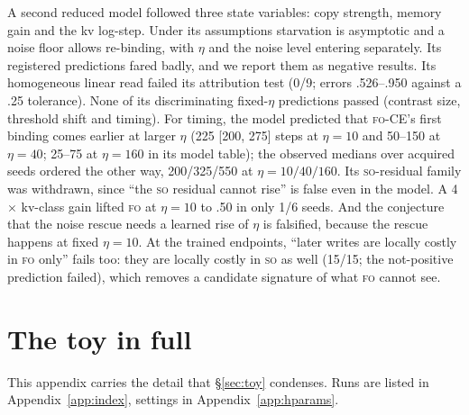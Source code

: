 \documentclass[11pt]{article}
\newcommand{\FO}{\textsc{fo}}
\newcommand{\SO}{\textsc{so}}
\begin{document}
A second reduced model followed three state variables: copy strength, memory gain and the kv
log-step. Under its assumptions starvation is asymptotic and a noise floor allows re-binding, with
$\eta$ and the noise level entering separately. Its registered predictions fared badly, and we report
them as negative results. Its homogeneous linear read failed its attribution test (0/9; errors
.526--.950 against a .25 tolerance). None of its discriminating fixed-$\eta$ predictions passed
(contrast size, threshold shift and timing). For timing, the model predicted that \FO-CE's first
binding comes earlier at larger $\eta$ (225 [200, 275] steps at $\eta=10$ and 50--150 at $\eta=40$;
25--75 at $\eta=160$ in its model table); the observed medians over acquired seeds ordered the other
way, 200/325/550 at $\eta=10/40/160$. Its \SO-residual family was withdrawn, since ``the \SO{} residual cannot rise'' is false even
in the model. A 4$\times$ kv-class gain lifted \FO{} at $\eta=10$ to .50 in only 1/6 seeds. And the
conjecture that the noise rescue needs a learned rise of $\eta$ is falsified, because the rescue
happens at fixed $\eta=10$. At the trained endpoints, ``later writes are locally costly in \FO{}
only'' fails too: they are locally costly in \SO{} as well (15/15; the not-positive prediction
failed), which removes a candidate signature of what
\FO{} cannot see.

\FloatBarrier

\section{The toy in full}
\label{app:toy}

This appendix carries the detail that \S\ref{sec:toy} condenses. Runs are listed in
Appendix~\ref{app:index}, settings in Appendix~\ref{app:hparams}.
\end{document}
